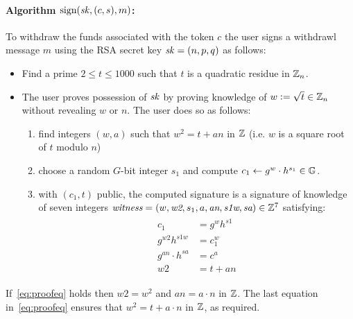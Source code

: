 \documentclass[11pt]{article}
\begin{document}
\paragraph{Algorithm $\text{sign}(\mathit{sk}, (c, s), m)$:}  
To withdraw the funds associated with the token $c$ the user
signs a withdrawl message $m$ using the RSA secret key $\mathit{sk} = (n,p,q)$ 
as follows:
\begin{itemize}
\item Find a prime $2 \leq t \leq 1000$  such that $t$ is a quadratic 
residue in $\mathbb Z_n$. 

\item The user proves possession of $\mathit{sk}$ by proving knowledge of 
$w \mathrel{\mathop:}= \sqrt{t} \in \mathbb Z_n$ without revealing $w$ or $n$. 
The user does so as follows:
\begin{enumerate}
\item find integers $(w,a)$ such that $w^2 = t + a n$ in $\mathbb Z$
           (i.e. $w$ is a square root of $t$ modulo $n$)

\item choose a random $G$-bit integer $s_1$ and compute
           $c_1 \gets g^w \cdot h^{s_1} \in \mathbb G$.

\item with $(c_1, t)$ public, the computed signature is a
  signature of knowledge of seven integers 
   $\textit{witness} = (w, \textit{w2}, s_1, a, \textit{an}, \textit{s1w}, \textit{sa}) \in \mathbb Z^7$
satisfying:
\begin{align} \label{eq:proofeq}
\begin{split}
     c_1 & = g^w h^{\textit{s1}} \\
     g^{\textit{w2}} h^{\textit{s1w}} & = c_1^w \\
     g^{\textit{an}} \cdot h^{\textit{sa}} & = c^a \\
     \textit{w2} & = t + \textit{an}
\end{split}
\end{align}
\end{enumerate}
\end{itemize}
If~\eqref{eq:proofeq} holds then $w2 = w^2$ and $\mathit{an} = a \cdot n$
in $\mathbb Z$.
The last equation in~\eqref{eq:proofeq} 
ensures that $w^2 = t + a \cdot n$ in $\mathbb Z$,
as required. 
\end{document}
